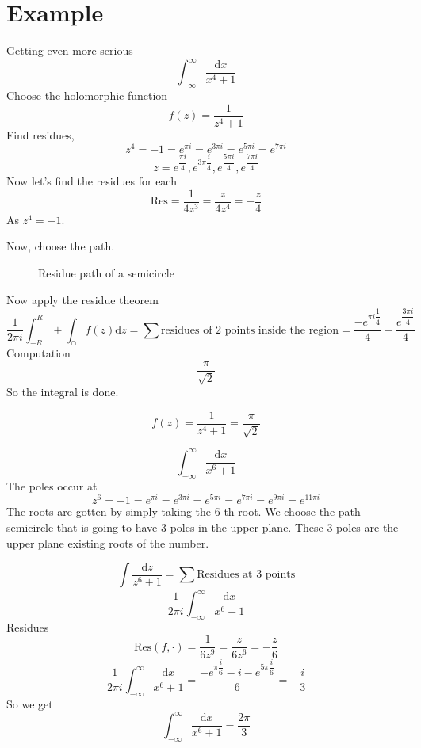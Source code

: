 \documentclass[letter]{article}
\renewcommand{\frac}{\dfrac}
\begin{document}
\section*{Example} 
Getting even more serious
\[
	\int_{-\infty}^{\infty} \frac{\mathrm{d} x}{x^{4} + 1}
\] Choose the holomorphic function 
\[
f(z) = \frac{1}{z^{4} + 1}
\] 
Find residues, 
\[
z^{4} = -1 = e^{\pi i } = e^{3 \pi i} = e^{5 \pi i } = e^{7 \pi i}
\] 
\[
z = e^{\frac{\pi i }{4}} , e^{3 \pi \frac{i}{4}}, e^{\frac{5 \pi i }{4}}, e^{\frac{7 \pi i}{4}}
\] 
Now let's find the residues for each 
\[
\text{Res} = \frac{1}{4z^3} = \frac{z}{4 z^{4}} = - \frac{z}{4}
\] 
As $z^{4} = -1$. 

Now, choose the path. 

\begin{figure}[ht]
    \centering
    \caption{Residue path of a semicircle}
    \label{fig:residue-path-of-a-semicircle}
\end{figure}

Now apply the residue theorem 
\[
	\frac{1}{2 \pi i } \int_{-R}^{R} + \int_{\cap } f(z) \mathrm{d} z = \sum \text{residues of 2 points inside the region} = \frac{- e^{\pi i \frac{1}{4}}}{4} - \frac{e^{\frac{3 \pi i }{4}}}{4} 
\]
Computation 
\[
\frac{\pi}{\sqrt{2} }
\]
So the integral is done. 

\[
f(z) = \frac{1}{z^{4} + 1} = \frac{\pi}{\sqrt{2} }
\] 

\[
	\int_{-\infty}^{\infty} \frac{\mathrm{d} x}{x^{6}+1}
\] 
The poles occur at 
\[
z^{6} = -1 = e^{\pi i } = e^{3 \pi i } = e^{5 \pi i } = e^{7 \pi i } = e^{9 \pi i } = e^{11 \pi i }
\] 
The roots are gotten by simply taking the $6$ th root.
We choose the path semicircle that is going to have 3 poles in the upper plane. These 3 poles are the upper plane existing roots of the number.

\[
\int \frac{\mathrm{d} z}{z^{6} +1} = \sum_{}^{} \text{Residues at 3 points}
\] 
\[
	\frac{1}{2 \pi i } \int_{-\infty}^{\infty} \frac{\mathrm{d} x}{x^{6} + 1}
\]
Residues
\[
\text{Res}(f, \cdot) = \frac{1}{6 z^{9}} = \frac{z}{6 z^{6}} = - \frac{z}{6}
\]
\[
	\frac{1}{2 \pi i} \int_{-\infty}^{\infty} \frac{\mathrm{d} x}{x^{6}+1} =
\frac{
-e^{\pi \frac{i}{6}} - i - e^{5 \pi \frac{i}{6}}
}{6} = - \frac{i}{3}
\] 
So we get
\[
	\int_{-\infty}^{\infty} \frac{\mathrm{d} x}{x^{6} +1} = \frac{2 \pi }{3}
\] 
\end{document}
